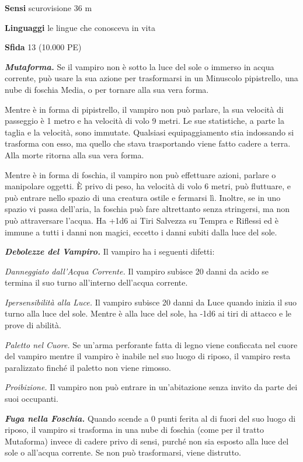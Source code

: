 \begin{multicols}{2}
\textbf{Sensi} scurovisione 36 m

\textbf{Linguaggi} le lingue che conosceva in vita

\textbf{Sfida} 13 (10.000 PE)

\emph{\textbf{Mutaforma.}} Se il vampiro non è sotto la luce del sole o immerso in acqua corrente, può usare la sua azione per trasformarsi in un Minuscolo pipistrello, una nube di foschia Media, o per tornare alla sua vera forma.

Mentre è in forma di pipistrello, il vampiro non può parlare, la sua velocità di passeggio è 1 metro e ha velocità di volo 9 metri. Le sue statistiche, a parte la taglia e la velocità, sono immutate. Qualsiasi equipaggiamento stia indossando si trasforma con esso, ma quello che stava trasportando viene fatto cadere a terra. Alla morte ritorna alla sua vera forma.

Mentre è in forma di foschia, il vampiro non può effettuare azioni, parlare o manipolare oggetti. È privo di peso, ha velocità di volo 6 metri, può fluttuare, e può entrare nello spazio di una creatura ostile e fermarsi lì. Inoltre, se in uno spazio vi passa dell'aria, la foschia può fare altrettanto senza stringersi, ma non può attraversare l'acqua. Ha +1d6 ai Tiri Salvezza su Tempra e Riflessi ed è immune a tutti i danni non magici, eccetto i danni subiti dalla luce del
sole.

\emph{\textbf{Debolezze del Vampiro.}} Il vampiro ha i seguenti difetti:

\emph{Danneggiato dall'Acqua Corrente.} Il vampiro subisce 20 danni da acido se termina il suo turno all'interno dell'acqua corrente.

\emph{Ipersensibilità alla Luce.} Il vampiro subisce 20 danni da Luce quando inizia il suo turno alla luce del sole. Mentre è alla luce del sole, ha -1d6 ai tiri di attacco e le prove di abilità. 

\emph{Paletto nel Cuore.} Se un'arma perforante fatta di legno viene conficcata nel cuore del vampiro mentre il vampiro è inabile nel suo luogo di riposo, il vampiro resta paralizzato finché il paletto non viene rimosso.

\emph{Proibizione.} Il vampiro non può entrare in un'abitazione senza invito da parte dei suoi occupanti.

\emph{\textbf{Fuga nella Foschia.}} Quando scende a 0 punti ferita al di fuori del suo luogo di riposo, il vampiro si trasforma in una nube di foschia (come per il tratto Mutaforma) invece di cadere privo di sensi, purché non sia esposto alla luce del sole o all'acqua corrente. Se non può trasformarsi, viene distrutto.


\end{multicols}
